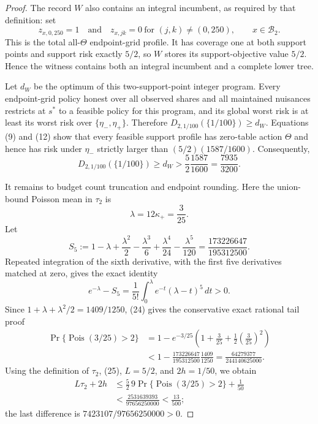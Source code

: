 \documentclass{article}
\begin{document}
\begin{proof}
The record \(W\) also contains an integral incumbent, as required by that definition: set
\[
 z_{x,0,250}=1
 \quad\text{and}\quad
 z_{x,jk}=0\ \text{for }(j,k)\ne(0,250),
 \qquad x\in\mathcal B_2.
\tag{22}
\]
This is the total all-\(\Theta\) endpoint-grid profile. It has coverage one at both support points and support risk exactly \(5/2\), so \(W\) stores its support-objective value \(5/2\). Hence the witness contains both an integral incumbent and a complete lower tree.

Let \(d_W\) be the optimum of this two-support-point integer program. Every endpoint-grid policy honest over all observed shares and all maintained nuisances restricts at \(s^*\) to a feasible policy for this program, and its global worst risk is at least its worst risk over \(\{\eta_-,\eta_+\}\). Therefore \(D_{2,1/100}(\{1/100\})\ge d_W\). Equations (9) and (12) show that every feasible support profile has zero-table action \(\Theta\) and hence has risk under \(\eta_-\) strictly larger than \((5/2)(1587/1600)\). Consequently,
\[
 D_{2,1/100}(\{1/100\})\ge d_W
 >\frac52\frac{1587}{1600}
 =\frac{7935}{3200}.
\tag{23}
\]

It remains to budget count truncation and endpoint rounding. Here the union-bound Poisson mean in \(\tau_2\) is
\[
 \lambda=12\kappa_+=\frac3{25}.
\]
Let
\[
 S_5:=1-\lambda+\frac{\lambda^2}{2}-\frac{\lambda^3}{6}
       +\frac{\lambda^4}{24}-\frac{\lambda^5}{120}
 =\frac{173226647}{195312500}.
\tag{24}
\]
Repeated integration of the sixth derivative, with the first five derivatives matched at zero, gives the exact identity
\[
 e^{-\lambda}-S_5
 =\frac1{5!}\int_0^\lambda e^{-t}(\lambda-t)^5\,dt>0.
\]
Since \(1+\lambda+\lambda^2/2=1409/1250\), (24) gives the conservative exact rational tail proof
\[
 \begin{aligned}
 \Pr\{\operatorname{Pois}(3/25)>2\}
 &=1-e^{-3/25}\left(1+\frac3{25}+\frac12\left(\frac3{25}\right)^2\right)\\
 &<1-\frac{173226647}{195312500}\frac{1409}{1250}
 =\frac{64279377}{244140625000}.
\end{aligned}
\tag{25}
\]
Using the definition of \(\tau_2\), (25), \(L=5/2\), and \(2h=1/50\), we obtain
\[
 \begin{aligned}
 L\tau_2+2h
 &\le \frac52\,9\Pr\{\operatorname{Pois}(3/25)>2\}+\frac1{50}\\
 &<\frac{2531639393}{97656250000}
 <\frac{13}{500};
\end{aligned}
\tag{26}
\]
the last difference is \(7423107/97656250000>0\).


\end{proof}
\end{document}
